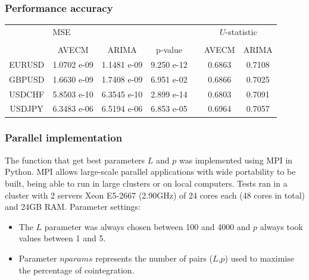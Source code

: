 \documentclass{beamer}
\begin{document}
\begin{frame}
\frametitle{Performance accuracy}
\small
\begin{tabular}{ccccccc}
& \multicolumn{3}{l}{MSE} & &
\multicolumn{2}{c}{$U$-statistic} \\ 
\hhline{~---~--} \\
 & AVECM & ARIMA & p-value & &
AVECM & ARIMA \\ 

\hline
 EURUSD & 1.0702 e-09 & 1.1481 e-09 &  9.250 e-12 & & 0.6863 & 0.7108\\
 GBPUSD & 1.6630 e-09 & 1.7408 e-09 &  6.951 e-02 & & 0.6866 & 0.7025\\
 USDCHF & 5.8503 e-10 & 6.3545 e-10 &  2.899 e-14 & & 0.6803 & 0.7091\\
 USDJPY  & 6.3483 e-06 & 6.5194 e-06 &  6.853 e-05 & & 0.6964 & 0.7057
 \end{tabular}
 \end{frame}
%
%
%
\begin{frame}
\frametitle{Parallel implementation}
The function that get best parameters $L$ and $p$ was implemented using MPI in Python. MPI allows large-scale parallel applications
with wide portability to be built, being able to run in large clusters
or on local computers.
Tests ran in a cluster with 2 servers Xeon E5-2667 (2.90GHz)
of 24 cores each (48 cores in total) and 24GB RAM.
Parameter settings:
\begin{itemize}
\item The $L$ parameter was always chosen between 100 and 4000 and $p$ always took values
between 1 and 5. 
\item Parameter $nparams$ represents the number of pairs ($L$,$p$) used to maximise the percentage of cointegration. 
\end{itemize}
\end{frame}
\end{document}
